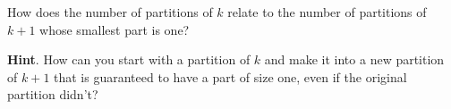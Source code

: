 \documentclass{book}
\begin{document}
\setcounter{cpjt}{213}
\addtocounter{cpjt}{-1}
\begin{activity}\label{activity-206}
\hypertarget{p-1135}{}%
How does the number of partitions of \(k\) relate to the number of partitions of \(k+1\) whose smallest part is one?%
\par\smallskip%
\noindent\textbf{Hint}.\hypertarget{hint-133}{}\quad%
\hypertarget{p-1136}{}%
How can you start with a partition of \(k\) and make it into a new partition of \(k+1\) that is guaranteed to have a part of size one, even if the original partition didn't?%
\par\smallskip%
\noindent\end{activity}

\clearpage
\end{document}
